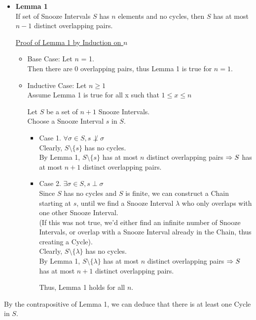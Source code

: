 \documentclass[fleqn]{article}
\newcommand{\set}[1]{\lbrace #1 \rbrace}
\newcommand{\ioverlap}{\perp}
\begin{document}
\begin{itemize}
  \item \textbf{Lemma 1}\\
        If set of Snooze Intervals $S$ has $n$ elements and no cycles,
        then $S$ has at most $n-1$ distinct overlapping pairs.

        \underline{Proof of Lemma 1 by Induction on $n$}
        \begin{itemize}
          \item Base Case: Let $n$ = 1.\\
                Then there are 0 overlapping pairs, thus
                Lemma 1 is true for $n=1$.
          \item Inductive Case: Let $n \geq 1$\\
                Assume Lemma 1 is true for all x such that $1 \leq x \leq n$

                Let $S$ be a set of $n+1$ Snooze Intervals.\\
                Choose a Snooze Interval $s$ in $S$.

                \begin{itemize}
                  \item Case 1. $\forall \sigma \in S, s \not\ioverlap \sigma$\\
                        Clearly, $S \setminus \set{s}$ has no cycles.\\
                        By Lemma 1, $S \setminus \set{s}$ has at most 
                        $n$ distinct overlapping pairs $\Rightarrow\\
                        S$ has at most $n+1$ distinct overlapping pairs.
                  \item Case 2. $\exists \sigma \in S, s \ioverlap \sigma$\\
                        Since $S$ has no cycles and $S$ is finite, we
                        can construct a Chain starting at $s$, until
                        we find a Snooze Interval $\lambda$ who only
                        overlaps with one other Snooze Interval.\\
                        (If this was not true, we'd either find an
                         infinite number of Snooze Intervals, or 
                         overlap with a Snooze Interval already in 
                         the Chain, thus creating a Cycle).\\
                        Clearly, $S \setminus \set{\lambda}$ has no cycles.\\
                        By Lemma 1, $S \setminus \set{\lambda}$ has at
                        most $n$ distinct overlapping pairs $\Rightarrow\\
                        S$ has at most $n+1$ distinct overlapping pairs.
                        
                        Thus, Lemma 1 holds for all $n$.
                \end{itemize}
        \end{itemize}

\end{itemize}
By the contrapositive of Lemma 1, we can deduce that there is at least one Cycle in $S$. 
\end{document}
